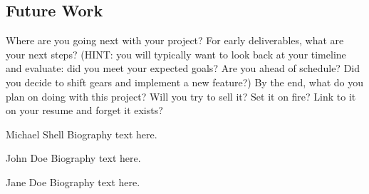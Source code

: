 \documentclass[10pt,conference,onecolumn,compsoc]{IEEEtran}
\begin{document}
\subsection{Future Work}
Where are you going next with your project?
For early deliverables, what are your next steps?  (HINT: you will typically want to look back at your timeline and evaluate: did you meet your expected goals?  Are you ahead of schedule?  Did you decide to shift gears and implement a new feature?)
By the end, what do you plan on doing with this project?  Will you try to sell it?  Set it on fire?  Link to it on your resume and forget it exists?



% 


\begin{IEEEbiography}{Michael Shell}
Biography text here.
\end{IEEEbiography}

\begin{IEEEbiographynophoto}{John Doe}
Biography text here.
\end{IEEEbiographynophoto}


\begin{IEEEbiographynophoto}{Jane Doe}
Biography text here.
\end{IEEEbiographynophoto}






\end{document}
